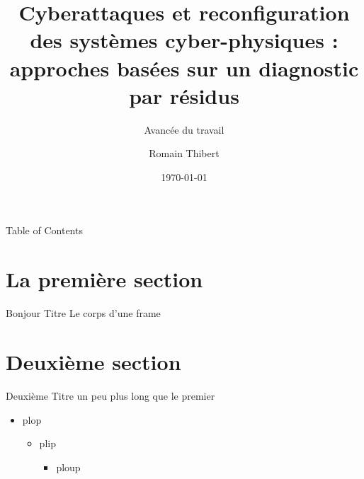 \documentclass[aspectratio=169]{beamer}
\title{Cyberattaques et reconfiguration des systèmes cyber-physiques : approches basées sur un diagnostic par résidus}
\subtitle{Avancée du travail}
\author[R. Thibert]{Romain Thibert}
\date[2022]{\today}
\begin{document}
\frame{\titlepage}

\begin{frame}{Table of Contents}
\tableofcontents
\end{frame}

\section{La première section}

\begin{frame}{Bonjour Titre}
Le corps d'une frame
\end{frame}

\section{Deuxième section}

\begin{frame}{Deuxième Titre un peu plus long que le premier}
\begin{itemize}
    \item plop
    \begin{itemize}
        \item plip
        \begin{itemize}
            \item ploup
        \end{itemize}
    \end{itemize}
\end{itemize}
\end{frame}
\end{document}
